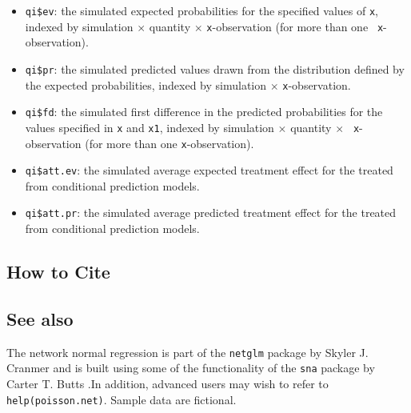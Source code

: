 \begin{itemize}
   \begin{itemize}
   \item {\tt qi\$ev}: the simulated expected probabilities for the
     specified values of {\tt x}, indexed by simulation $\times$
     quantity $\times$ {\tt x}-observation (for more than one {\tt
       x}-observation).
   \item {\tt qi\$pr}: the simulated predicted values drawn from the
     distribution defined by the expected probabilities, indexed by
     simulation $\times$ {\tt x}-observation.
   \item {\tt qi\$fd}: the simulated first difference in the predicted
     probabilities for the values specified in {\tt x} and {\tt x1},
     indexed by simulation $\times$ quantity $\times$ {\tt
       x}-observation (for more than one {\tt x}-observation).
   \item {\tt qi\$att.ev}: the simulated average expected treatment
     effect for the treated from conditional prediction models.  
   \item {\tt qi\$att.pr}: the simulated average predicted treatment
     effect for the treated from conditional prediction models.  
   \end{itemize}
\end{itemize}

\subsection* {How to Cite} 



\subsection* {See also}
The network normal regression is part of the {\tt netglm} package by Skyler J. Cranmer and is built using some of the functionality of the  {\tt sna} package by Carter T. Butts \citep{ButCar01}.In addition, advanced users may wish to refer to {\tt help(poisson.net)}. Sample data are fictional. 
